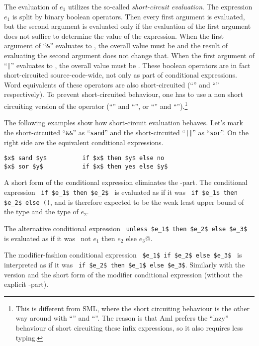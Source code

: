 The evaluation of $e_1$ utilizes the so-called {\em short-circuit evaluation}. The expression $e_1$ is split by binary boolean operators. Then every first argument is evaluated, but the second argument is evaluated only if the evaluation of the first argument does not suffice to determine the value of the expression. When the first argument of ``\lstinline!&!'' evaluates to , the overall value must be  and the result of evaluating the second argument does not change that. When the first argument of ``\lstinline!|!'' evaluates to , the overall value must be . These boolean operators are in fact short-circuited source-code-wide, not only as part of conditional expressions. Word equivalents of these operators are also short-circuited (``'' and ``'' respectively). To prevent short-circuited behaviour, one has to use a non short circuiting version of the operator (``'' and ``'', or ``\code{&&}'' and ``\code{||}'').\footnote{This is different from SML, where the short circuiting behaviour is the other way around with ``'' and ``''. The reason is that Aml prefers the ``lazy'' behaviour of short circuiting these infix expressions, so it also requires less typing.}

\example The following examples show how short-circuit evaluation behaves. Let's mark the short-circuited ``\lstinline!&&!'' as ``\lstinline!sand!'' and the short-circuited ``\lstinline!||!'' as ``\lstinline!sor!''. On the right side are the equivalent conditional expressions. 
\begin{lstlisting}
$x$ sand $y$          if $x$ then $y$ else no
$x$ sor $y$           if $x$ then yes else $y$
\end{lstlisting}

A short form of the conditional expression eliminates the -part. The conditional expression ~\lstinline!if $e_1$ then $e_2$!~ is evaluated as if it was ~\lstinline!if $e_1$ then $e_2$ else ()!, and is therefore expected to be the weak least upper bound of the type  and the type of $e_2$. 

The alternative conditional expression ~\lstinline!unless $e_1$ then $e_2$ else $e_3$!~ is evaluated as if it was ~\lstinline@if not $e_1$ then $e_2$ else $e_3$@. 

The modifier-fashion conditional expression ~\lstinline!$e_1$ if $e_2$ else $e_3$!~ is interpreted as if it was ~\lstinline!if $e_2$ then $e_1$ else $e_3$!. Similarly with the  version and the short form of the modifier conditional expression (without the explicit -part). 

